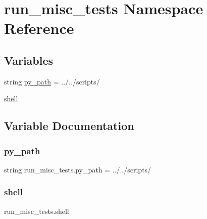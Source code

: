 \hypertarget{namespacerun__misc__tests}{}\section{run\+\_\+misc\+\_\+tests Namespace Reference}
\label{namespacerun__misc__tests}
\subsection*{Variables}
\begin{DoxyCompactItemize}
\item 
string \hyperlink{namespacerun__misc__tests_accbe3d5f85add865601f4e068b1d9bd3}{py\+\_\+path} = \textquotesingle{}../../scripts/\textquotesingle{}
\item 
\hyperlink{namespacerun__misc__tests_ad4138b48d29c7fe264e2ea4e434e1fe5}{shell}
\end{DoxyCompactItemize}


\subsection{Variable Documentation}
\mbox{\label{namespacerun__misc__tests_accbe3d5f85add865601f4e068b1d9bd3}} 
\subsubsection{\texorpdfstring{py\+\_\+path}{py\_path}}
{\footnotesize\ttfamily string run\+\_\+misc\+\_\+tests.\+py\+\_\+path = \textquotesingle{}../../scripts/\textquotesingle{}}

\mbox{\label{namespacerun__misc__tests_ad4138b48d29c7fe264e2ea4e434e1fe5}} 
\subsubsection{\texorpdfstring{shell}{shell}}
{\footnotesize\ttfamily run\+\_\+misc\+\_\+tests.\+shell}

